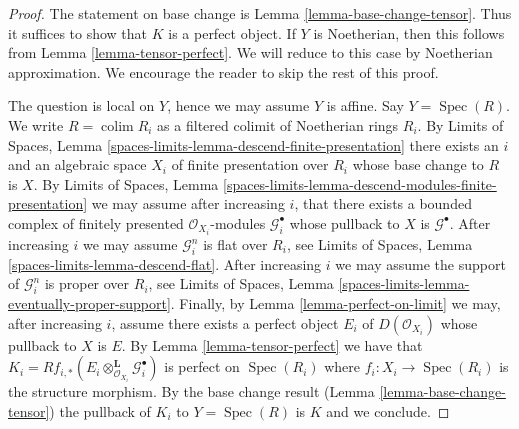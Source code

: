 \documentclass[10pt,a4paper]{amsart}
\theoremstyle{plain}
\theoremstyle{definition}
\theoremstyle{remark}
\numberwithin{equation}{subsection}
\def\colim{\mathop{\mathrm{colim}}\nolimits}
\def\Spec{\mathop{\mathrm{Spec}}}
\begin{document}
\begin{proof}
The statement on base change is Lemma \ref{lemma-base-change-tensor}.
Thus it suffices to show that $K$ is a perfect object. If $Y$ is
Noetherian, then this follows from
Lemma \ref{lemma-tensor-perfect}.
We will reduce to this case by Noetherian approximation.
We encourage the reader to skip the rest of this proof.

\medskip\noindent
The question is local on $Y$, hence we may assume $Y$ is affine.
Say $Y = \Spec(R)$. We write $R = \colim R_i$ as a filtered colimit
of Noetherian rings $R_i$. By Limits of Spaces, Lemma
\ref{spaces-limits-lemma-descend-finite-presentation}
there exists an $i$ and an algebraic space $X_i$ of finite presentation
over $R_i$ whose base change to $R$ is $X$. By
Limits of Spaces, Lemma
\ref{spaces-limits-lemma-descend-modules-finite-presentation}
we may assume after increasing $i$, that there exists a
bounded complex of finitely
presented $\mathcal{O}_{X_i}$-modules $\mathcal{G}_i^\bullet$ whose
pullback to $X$ is $\mathcal{G}^\bullet$. After increasing $i$
we may assume $\mathcal{G}_i^n$ is flat over $R_i$, see
Limits of Spaces, Lemma
\ref{spaces-limits-lemma-descend-flat}.
After increasing $i$ we may assume the support of $\mathcal{G}_i^n$
is proper over $R_i$, see
Limits of Spaces, Lemma \ref{spaces-limits-lemma-eventually-proper-support}.
Finally, by Lemma \ref{lemma-perfect-on-limit}
we may, after increasing $i$, assume there exists a perfect
object $E_i$ of $D(\mathcal{O}_{X_i})$ whose pullback to
$X$ is $E$. By Lemma \ref{lemma-tensor-perfect} we have that
$K_i =
Rf_{i, *}(E_i \otimes_{\mathcal{O}_{X_i}}^\mathbf{L} \mathcal{G}_i^\bullet)$
is perfect on $\Spec(R_i)$ where $f_i : X_i \to \Spec(R_i)$ is
the structure morphism. By the base change result
(Lemma \ref{lemma-base-change-tensor}) the pullback of $K_i$
to $Y = \Spec(R)$ is $K$ and we conclude.
\end{proof}
\end{document}
